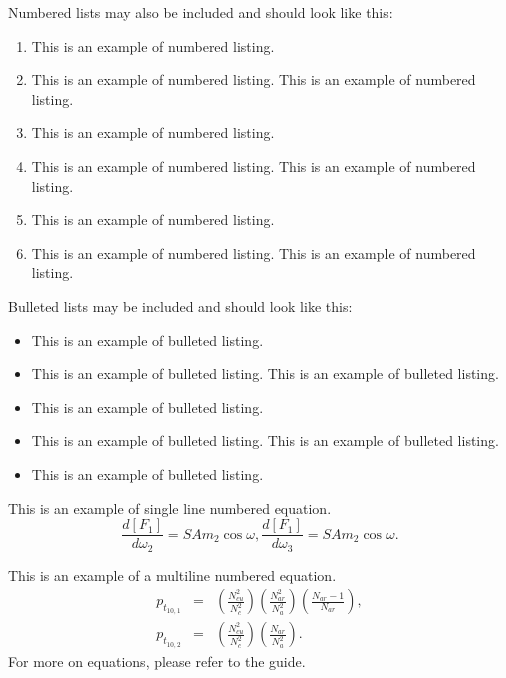 \documentclass{aip-cp}
\begin{document}
\noindent Numbered lists may also be included and should look like this:

\begin{enumerate}
\item This is an example of numbered listing.
\item This is an example of numbered listing. This is an example of numbered listing.
\item This is an example of numbered listing.
\item This is an example of numbered listing. This is an example of numbered listing.
\item This is an example of numbered listing.
\item This is an example of numbered listing. This is an example of numbered listing.
\end{enumerate}

\noindent Bulleted lists may be included and should look like this:

\begin{itemize}
\item This is an example of bulleted listing.
\item This is an example of bulleted listing. This is an example of bulleted listing.
\item This is an example of bulleted listing.
\item This is an example of bulleted listing. This is an example of bulleted listing.
\item This is an example of bulleted listing.
\end{itemize}

\noindent This is an example of single line numbered equation.
\begin{equation}
\frac{d[F_1]}{d\omega_2} = SAm_2\cos\omega,\frac{d[F_1]}{d\omega_3}= SAm_2\cos\omega.
\end{equation}

This is an example of a multiline numbered equation.
\begin{eqnarray}
p_{t_{10,1}}&=&\left(\frac{N_{cu}^2}{ N_c ^2}\right)\left(\frac{N_{ar}^2}{N_a^2}\right)\left(\frac{N_{ar}-1}{N_{ar}}\right),\\
p_{t_{10,2}}&=&\left(\frac{N_{cu}^2}{ N_c ^2}\right)\left(\frac{N_{ar}}{N_a^2}\right).
\end{eqnarray}
For more on equations, please refer to the guide.
\end{document}
